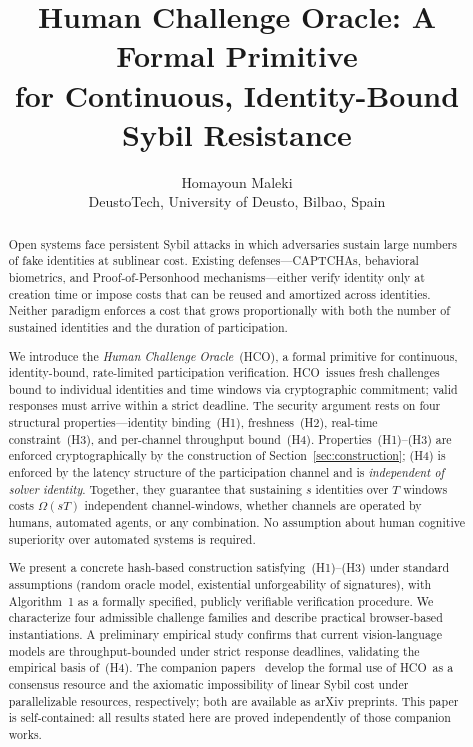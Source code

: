 \documentclass[11pt]{article}
\title{Human Challenge Oracle: A Formal Primitive\\
	for Continuous, Identity-Bound Sybil Resistance}
\author{Homayoun Maleki\\
	DeustoTech, University of Deusto, Bilbao, Spain}
\date{}
\newcommand{\HCO}{HCO\xspace}
\theoremstyle{remark}
\theoremstyle{plain}
\begin{document}
	
	\maketitle
	
	\begin{abstract}
		Open systems face persistent Sybil attacks in which adversaries sustain large
		numbers of fake identities at sublinear cost. Existing defenses---CAPTCHAs,
		behavioral biometrics, and Proof-of-Personhood mechanisms---either verify
		identity only at creation time or impose costs that can be reused and amortized
		across identities. Neither paradigm enforces a cost that grows proportionally
		with both the number of sustained identities and the duration of participation.
		
		We introduce the \emph{Human Challenge Oracle}~(\HCO), a formal primitive
		for continuous, identity-bound, rate-limited participation verification.
		\HCO\ issues fresh challenges bound to individual identities and time
		windows via cryptographic commitment; valid responses must arrive within
		a strict deadline. The security argument rests on four structural
		properties---identity binding~(H1), freshness~(H2), real-time
		constraint~(H3), and per-channel throughput bound~(H4).
		Properties~(H1)--(H3) are enforced cryptographically by the construction
		of Section~\ref{sec:construction}; (H4) is enforced by the latency
		structure of the participation channel and is \emph{independent of solver
			identity}. Together, they guarantee that sustaining $s$ identities over
		$T$ windows costs $\Omega(sT)$ independent channel-windows, whether
		channels are operated by humans, automated agents, or any combination.
		No assumption about human cognitive superiority over automated systems
		is required.
		
		We present a concrete hash-based construction satisfying~(H1)--(H3)
		under standard assumptions (random oracle model, existential
		unforgeability of signatures), with Algorithm~1 as a formally specified,
		publicly verifiable verification procedure. We characterize four admissible
		challenge families and describe practical browser-based instantiations.
		A preliminary empirical study confirms that current vision-language models
		are throughput-bounded under strict response deadlines, validating the
		empirical basis of~(H4). The companion
		papers~\cite{maleki2026pocmt,maleki2026geometry} develop the formal use
		of \HCO\ as a consensus resource and the axiomatic impossibility of linear
		Sybil cost under parallelizable resources, respectively; both are available
		as arXiv preprints. This paper is self-contained: all results stated here
		are proved independently of those companion works.
	\end{abstract}
	
\end{document}
